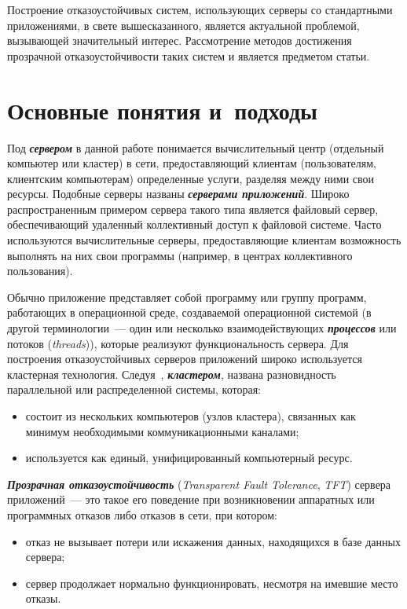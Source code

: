 \begin{multicols}{2}
{Построение отказоустойчивых систем, использующих серверы со
стандартными приложениями, в свете вышесказанного, является
 актуальной
проблемой, вызывающей значительный интерес. Рассмотрение методов
до\-сти\-же\-ния прозрачной отказоустойчивости таких сис\-тем и является
предметом статьи.

}

\section{Основные понятия и~подходы}
{\nwt

Под {\bfseries\textit{сервером}} в данной работе понимается вычислительный центр
(отдельный компьютер или кластер) в сети, предоставляющий
 клиентам
(пользователям, клиентским компьютерам) определенные услуги, разделяя
между ними свои ресурсы. Подобные серверы названы {\bfseries\textit{серверами
приложений}}. Широко распространенным примером сервера такого типа
является файловый сервер, обеспечивающий удаленный коллективный доступ к
файловой системе. Часто используются вычислительные серверы,
предоставляющие клиентам возможность выполнять на них свои программы
(например, в центрах коллективного пользования).
{

}

Обычно приложение представляет собой программу или группу программ,
ра\-бо\-та\-ющих в операционной среде, создаваемой операционной сис\-те\-мой (в
другой терминологии~--- один или несколь\-ко взаимодействующих
{\bfseries\textit{процессов}} или потоков (\textit{threads})), которые
 реализуют
функциональность сервера. Для
 построения отказоустойчивых серверов
приложений широко используется кластерная технология. Следуя~\cite{2zak},
{\bfseries\textit{кластером}}, названа разновидность параллельной или распределенной
сис\-те\-мы, которая:
\begin{itemize}
\item состоит из нескольких компьютеров (узлов кластера), связанных как
минимум необходимыми коммуникационными каналами;
\item используется как единый, унифицированный компьютерный ресурс.
\end{itemize}

{\bfseries\textit{Прозрачная отказоустойчивость}} (\textit{Transparent Fault Tolerance},
\textit{TFT}) сервера приложений~--- это такое его поведение при
возникновении аппаратных или программных отказов либо отказов в сети, при
котором:
\begin{itemize}
\item отказ не вызывает потери или искажения данных, находящихся в базе
данных сервера;
\item сервер продолжает нормально функционировать, несмотря на имевшие
место отказы.
\end{itemize}

}
\end{multicols}
